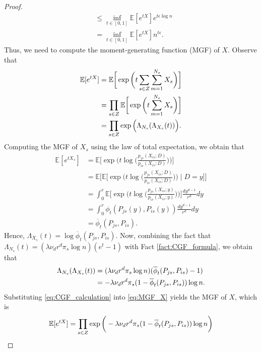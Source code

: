 \documentclass[10pt,a4paper]{amsart}
\newcommand{\E}{\mathbb{E}}
\begin{document}
\begin{proof}
\begin{align}
        &\leq \inf_{t \in [0, 1]} \E[e^{tX}] e^{t\epsilon \log n}  \nonumber \\
        &= \inf_{t \in [0, 1]} \E[e^{tX}]n^{t\epsilon}.     \label{eq:Chernoff_bound_X}
    \end{align}
    Thus, we need to compute the moment-generating function (MGF) of $X$. Observe that
    \begin{align}
    \label{eq:MGF_X}
        \E[e^{tX}] &= \E\bigg[\exp\bigg(t\sum_{s \in Z} \sum_{m=1}^{N_s} X_s\bigg)\bigg] \notag \\
        &= \prod_{s \in Z} \E\bigg[\exp\bigg(t\sum_{m=1}^{N_s} X_s\bigg)\bigg] \notag \\
        &= \prod_{s \in Z} \exp\Big(\Lambda_{N_s}(\Lambda_{X_s}(t))\Big).
    \end{align}
    Computing the MGF of $X_s$ using the law of total expectation, we obtain that
    \begin{align*}
        \E[e^{tX_s}] &= \E\bigg[\exp\bigg(t \log\Big( \frac{p_{js}(X_{is};D)}{p_{is}(X_{is};D)} \Big)\bigg)\bigg] \\
        &= \E\bigg[\E\bigg[\exp\bigg(t \log\Big( \frac{p_{js}(X_{is};D)}{p_{is}(X_{is};D)} \Big)\bigg) \mid D = y\bigg]\bigg] \\
        &= \int_0^r \E\bigg[ \exp\bigg(t \log\Big( \frac{p_{js}(X_{is};y)}{p_{is}(X_{is};y)} \Big)\bigg)\bigg] \frac{dy^{d-1}}{r^d} dy \\
        &= \int_0^r \phi_t(P_{js}(y), P_{is}(y)) \frac{dy^{d-1}}{r^d} dy \\
        &= \overline{\phi}_t(P_{js}, P_{is}).
    \end{align*}
    Hence, $\Lambda_{X_s}(t) = \log \overline{\phi}_t(P_{js}, P_{is})$. Now, combining the fact that $\Lambda_{N_s}(t) = (\lambda \nu_d r^d \pi_s \log n)(e^t - 1)$ with Fact \ref{fact:CGF_formula}, we obtain that
    \begin{align}
    \label{eq:CGF_calculation}
        \Lambda_{N_s}(\Lambda_{X_s}(t)) &= (\lambda \nu_d r^d \pi_s \log n) (\overline{\phi}_t(P_{js}, P_{is}) - 1) \notag \\
        &= - \lambda \nu_d r^d \pi_s (1 - \overline{\phi}_t(P_{js}, P_{is})) \log n.
    \end{align}
    Substituting \eqref{eq:CGF_calculation} into \eqref{eq:MGF_X} yields the MGF of $X$, which is
    \begin{align}
    \label{eq:MGF_X_finished}
        \E[e^{tX}] &= \prod_{s \in Z} \exp\bigg( - \lambda \nu_d r^d \pi_s (1 - \overline{\phi}_t(P_{js}, P_{is})) \log n \bigg) \notag \\

\end{align}
\end{proof}
\end{document}
